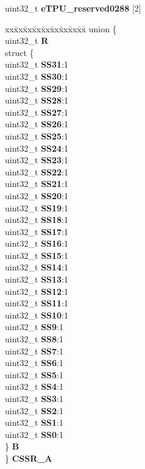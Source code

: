 \begin{DoxyCompactItemize}
\begin{tabbing}
\end{tabbing}\item 
\mbox{\label{structETPU__tag_a78b11b7221635673fce6f6084476d640}} 
uint32\+\_\+t {\bfseries e\+T\+P\+U\+\_\+reserved0288} \mbox{[}2\mbox{]}
\item 
\mbox{\label{structETPU__tag_ac2e2f4dd905763f1d526e1ae4a2b33e0}} 
\begin{tabbing}
xx\=xx\=xx\=xx\=xx\=xx\=xx\=xx\=xx\=\kill
union \{\\
\>uint32\_t {\bfseries R}\\
\>struct \{\\
\>\>uint32\_t {\bfseries SS31}:1\\
\>\>uint32\_t {\bfseries SS30}:1\\
\>\>uint32\_t {\bfseries SS29}:1\\
\>\>uint32\_t {\bfseries SS28}:1\\
\>\>uint32\_t {\bfseries SS27}:1\\
\>\>uint32\_t {\bfseries SS26}:1\\
\>\>uint32\_t {\bfseries SS25}:1\\
\>\>uint32\_t {\bfseries SS24}:1\\
\>\>uint32\_t {\bfseries SS23}:1\\
\>\>uint32\_t {\bfseries SS22}:1\\
\>\>uint32\_t {\bfseries SS21}:1\\
\>\>uint32\_t {\bfseries SS20}:1\\
\>\>uint32\_t {\bfseries SS19}:1\\
\>\>uint32\_t {\bfseries SS18}:1\\
\>\>uint32\_t {\bfseries SS17}:1\\
\>\>uint32\_t {\bfseries SS16}:1\\
\>\>uint32\_t {\bfseries SS15}:1\\
\>\>uint32\_t {\bfseries SS14}:1\\
\>\>uint32\_t {\bfseries SS13}:1\\
\>\>uint32\_t {\bfseries SS12}:1\\
\>\>uint32\_t {\bfseries SS11}:1\\
\>\>uint32\_t {\bfseries SS10}:1\\
\>\>uint32\_t {\bfseries SS9}:1\\
\>\>uint32\_t {\bfseries SS8}:1\\
\>\>uint32\_t {\bfseries SS7}:1\\
\>\>uint32\_t {\bfseries SS6}:1\\
\>\>uint32\_t {\bfseries SS5}:1\\
\>\>uint32\_t {\bfseries SS4}:1\\
\>\>uint32\_t {\bfseries SS3}:1\\
\>\>uint32\_t {\bfseries SS2}:1\\
\>\>uint32\_t {\bfseries SS1}:1\\
\>\>uint32\_t {\bfseries SS0}:1\\
\>\} {\bfseries B}\\
\} {\bfseries CSSR\_A}\\


\end{tabbing}
\end{DoxyCompactItemize}
